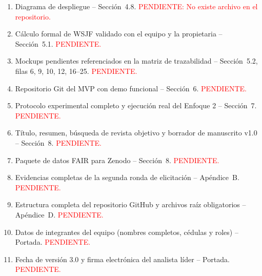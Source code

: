 \documentclass[11pt,a4paper]{article}
\begin{document}
\begin{enumerate}[nosep]
\item Diagrama de despliegue -- Sección~4.8. \textcolor{red}{PENDIENTE: No existe archivo en el repositorio.}
\item Cálculo formal de WSJF validado con el equipo y la propietaria -- Sección~5.1. \textcolor{red}{PENDIENTE.}
\item Mockups pendientes referenciados en la matriz de trazabilidad -- Sección~5.2, filas 6, 9, 10, 12, 16--25. \textcolor{red}{PENDIENTE.}
\item Repositorio Git del MVP con demo funcional -- Sección~6. \textcolor{red}{PENDIENTE.}
\item Protocolo experimental completo y ejecución real del Enfoque 2 -- Sección~7. \textcolor{red}{PENDIENTE.}
\item Título, resumen, búsqueda de revista objetivo y borrador de manuscrito v1.0 -- Sección~8. \textcolor{red}{PENDIENTE.}
\item Paquete de datos FAIR para Zenodo -- Sección~8. \textcolor{red}{PENDIENTE.}
\item Evidencias completas de la segunda ronda de elicitación -- Apéndice~B. \textcolor{red}{PENDIENTE.}
\item Estructura completa del repositorio GitHub y archivos raíz obligatorios -- Apéndice~D. \textcolor{red}{PENDIENTE.}
\item Datos de integrantes del equipo (nombres completos, cédulas y roles) -- Portada. \textcolor{red}{PENDIENTE.}
\item Fecha de versión 3.0 y firma electrónica del analista líder -- Portada. \textcolor{red}{PENDIENTE.}
\end{enumerate}

\newpage


\end{document}
